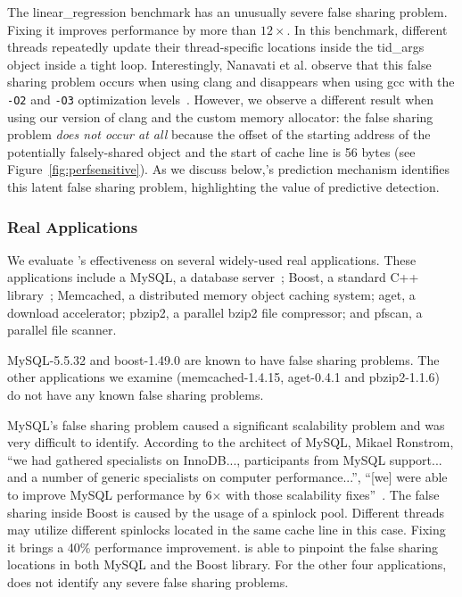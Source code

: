 The linear\_regression benchmark has an unusually severe false sharing problem. Fixing it improves performance by more than $12\times$. In this benchmark, different threads repeatedly update their thread-specific locations inside the tid\_args object inside a tight loop. Interestingly, Nanavati et al. observe that this false sharing problem occurs when using clang and disappears when using gcc with the \texttt{-O2} and \texttt{-O3} optimization levels~\cite{OSdetection}. However, we observe a different result when using our version of clang and the custom memory allocator: the false sharing problem \emph{does not occur at all} because the offset of the starting address of the potentially falsely-shared object and the start of cache line is 56 bytes (see Figure~\ref{fig:perfsensitive}). As we discuss below,\Predator{}'s prediction mechanism identifies this latent false sharing problem, highlighting the value of predictive detection.

\subsubsection{Real Applications}
We evaluate \Predator{}'s effectiveness on several widely-used real applications. These applications include a MySQL, a database server~\cite{mysql};
Boost, a standard C++ library~\cite{libfalsesharing};
Memcached, a distributed memory object caching system; aget, a download accelerator;
pbzip2, a parallel bzip2 file compressor; and pfscan, a parallel file scanner.

MySQL-5.5.32 and boost-1.49.0 are known to have false sharing problems. The other applications we examine (memcached-1.4.15, aget-0.4.1 and pbzip2-1.1.6) do not have  any known false sharing problems.

MySQL's false sharing problem caused a significant scalability problem and was very difficult to identify.
According to the architect of MySQL, Mikael Ronstrom, ``we had gathered specialists on InnoDB..., participants from MySQL support... and a number of generic specialists on 
computer performance...'', ``[we] were able to improve MySQL performance by 6$\times$ with those scalability fixes''~\cite{mysql}. 
The false sharing inside Boost is caused by the usage of a spinlock pool. Different threads may utilize different spinlocks located in the same cache line in this case. Fixing it brings a 40\% performance improvement.
\Predator{} is able to pinpoint the false sharing locations in both MySQL and the Boost library. 
For the other four applications, \Predator{} does not identify any severe false sharing problems.

